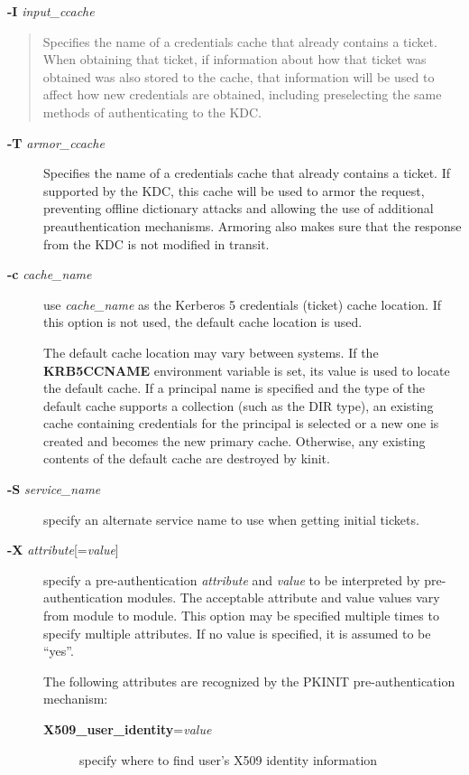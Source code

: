 \documentclass[letterpaper,10pt,english]{sphinxmanual}
\begin{document}
\textbf{-I} \emph{input\_ccache}
\begin{quote}

Specifies the name of a credentials cache that already contains a
ticket.  When obtaining that ticket, if information about how that
ticket was obtained was also stored to the cache, that information
will be used to affect how new credentials are obtained, including
preselecting the same methods of authenticating to the KDC.
\end{quote}
\begin{description}
\item[{\textbf{-T} \emph{armor\_ccache}}] \leavevmode
Specifies the name of a credentials cache that already contains a
ticket.  If supported by the KDC, this cache will be used to armor
the request, preventing offline dictionary attacks and allowing
the use of additional preauthentication mechanisms.  Armoring also
makes sure that the response from the KDC is not modified in
transit.

\item[{\textbf{-c} \emph{cache\_name}}] \leavevmode
use \emph{cache\_name} as the Kerberos 5 credentials (ticket) cache
location.  If this option is not used, the default cache location
is used.

The default cache location may vary between systems.  If the
\textbf{KRB5CCNAME} environment variable is set, its value is used to
locate the default cache.  If a principal name is specified and
the type of the default cache supports a collection (such as the
DIR type), an existing cache containing credentials for the
principal is selected or a new one is created and becomes the new
primary cache.  Otherwise, any existing contents of the default
cache are destroyed by kinit.

\item[{\textbf{-S} \emph{service\_name}}] \leavevmode
specify an alternate service name to use when getting initial
tickets.

\item[{\textbf{-X} \emph{attribute}{[}=\emph{value}{]}}] \leavevmode
specify a pre-authentication \emph{attribute} and \emph{value} to be
interpreted by pre-authentication modules.  The acceptable
attribute and value values vary from module to module.  This
option may be specified multiple times to specify multiple
attributes.  If no value is specified, it is assumed to be ``yes''.

The following attributes are recognized by the PKINIT
pre-authentication mechanism:
\begin{description}
\item[{\textbf{X509\_user\_identity}=\emph{value}}] \leavevmode
specify where to find user's X509 identity information


\end{description}
\end{description}
\end{document}
